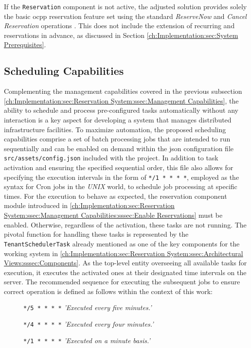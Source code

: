 \noindent If the \texttt{Reservation} component is not active, the adjusted solution provides solely the basic \acrshort{ocpp} reservation feature set using the standard \textit{ReserveNow} and \textit{Cancel Reservation} operations \cite{noauthor_ocpp_nodate}. This does not include the extension of recurring and reservations in advance, as discussed in Section \ref{ch:Implementation:sec:System Prerequisites}.

\subsection{Scheduling Capabilities}
\label{ch:Implementation:sec:Reservation System:ssec:Scheduling Capabilities}

Complementing the management capabilities covered in the previous subsection \ref{ch:Implementation:sec:Reservation System:ssec:Management Capabilities}, the ability to schedule and process pre-configured tasks automatically without any interaction is a key aspect for developing a system that manages distributed infrastructure facilities. 
To maximize automation, the proposed scheduling capabilities comprise a set of batch processing jobs that are intended to run sequentially and can be enabled on demand within the \acrshort{json} configuration file \texttt{src/assets/config.json} included with the project. 
In addition to task activation and ensuring the specified sequential order, this file also allows for specifying the execution intervals in the form of \texttt{*/1 * * * *}, employed as the syntax for Cron jobs in the \textit{UNIX} world, to schedule job processing at specific times.
For the execution to behave as expected, the reservation component module introduced in \ref{ch:Implementation:sec:Reservation System:ssec:Management Capabilities:sssec:Enable Reservations} must be enabled. Otherwise, regardless of the activation, these tasks are not running.
The pivotal function for handling these tasks is represented by the \texttt{TenantSchedulerTask} already mentioned as one of the key components for the working system in \ref{ch:Implementation:sec:Reservation System:ssec:Architectural Views:sssec:Components}.
As the top-level entity overseeing all available tasks for execution, it executes the activated ones at their designated time intervals on the server.
The recommended sequence for executing the subsequent jobs to ensure correct operation is defined as follows within the context of this work:
\begin{description}
    \item[]{ \texttt{*/5 * * * *} \quad \textit{'Executed every five minutes.'}}
    \item[]{ \texttt{*/4 * * * *} \quad \textit{'Executed every four minutes.'}}
    \item[]{ \texttt{*/1 * * * *} \quad \textit{'Executed on a minute basis.'}}
\end{description}

